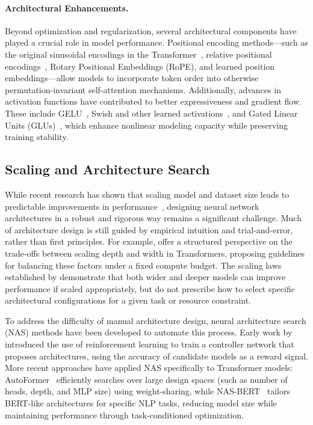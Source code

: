 \paragraph{Architectural Enhancements.} Beyond optimization and regularization, several architectural components have played a crucial role in model performance. Positional encoding methods—such as the original sinusoidal encodings in the Transformer~\citep{vaswani2017attention}, relative positional encodings~\citep{shaw2018self}, Rotary Positional Embeddings (RoPE)\citep{su2024rope}, and learned position embeddings\citep{press2021train}—allow models to incorporate token order into otherwise permutation-invariant self-attention mechanisms. Additionally, advances in activation functions have contributed to better expressiveness and gradient flow. These include GELU~\citep{hendrycks2016gaussian}, Swish and other learned activations~\citep{ramachandran2017searching}, and Gated Linear Units (GLUs)~\citep{shazeer2020glu}, which enhance nonlinear modeling capacity while preserving training stability.

\subsection{Scaling and Architecture Search}
While recent research has shown that scaling model and dataset size leads to predictable improvements in performance~\citep{kaplan2020scaling, henighan2020scaling}, designing neural network architectures in a robust and rigorous way remains a significant challenge. Much of architecture design is still guided by empirical intuition and trial-and-error, rather than first principles. For example, \citet{levine2020depth} offer a structured perspective on the trade-offs between scaling depth and width in Transformers, proposing guidelines for balancing these factors under a fixed compute budget. The scaling laws established by \citet{kaplan2020scaling} demonstrate that both wider and deeper models can improve performance if scaled appropriately, but do not prescribe how to select specific architectural configurations for a given task or resource constraint.

To address the difficulty of manual architecture design, neural architecture search (NAS) methods have been developed to automate this process. Early work by \citet{zoph2017neural} introduced the use of reinforcement learning to train a controller network that proposes architectures, using the accuracy of candidate models as a reward signal. More recent approaches have applied NAS specifically to Transformer models: AutoFormer~\citep{chen2021autoformer} efficiently searches over large design spaces (such as number of heads, depth, and MLP size) using weight-sharing, while NAS-BERT~\citep{xu2021nasbert} tailors BERT-like architectures for specific NLP tasks, reducing model size while maintaining performance through task-conditioned optimization.

